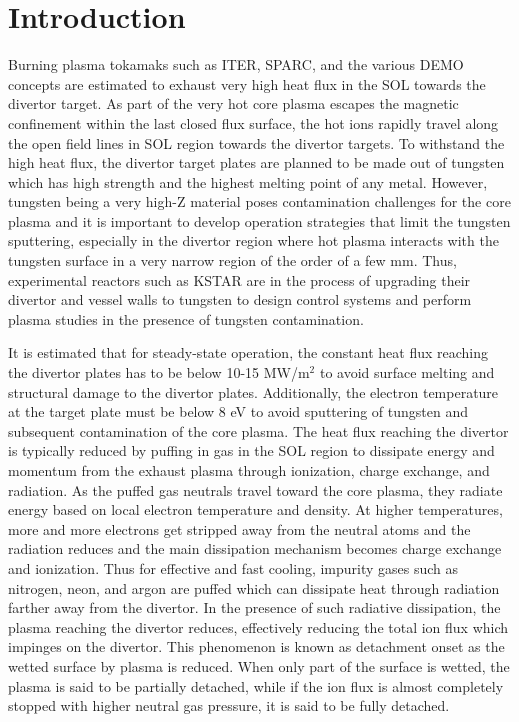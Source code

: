 \section{Introduction}
\label{sec:introduction}

Burning plasma tokamaks such as ITER\cite{Holtkamp_2007_FED}, SPARC\cite{Creely_2020_JPP}, and the various DEMO concepts are estimated to exhaust very high heat flux in the \ac{SOL} towards the divertor target.
As part of the very hot core plasma escapes the magnetic confinement within the last closed flux surface, the hot ions rapidly travel along the open field lines in \ac{SOL} region towards the divertor targets.
To withstand the high heat flux, the divertor target plates are planned to be made out of tungsten which has high strength and the highest melting point of any metal.
However, tungsten being a very high-Z material poses contamination challenges for the core plasma and it is important to develop operation strategies that limit the tungsten sputtering, especially in the divertor region where hot plasma interacts with the tungsten surface in a very narrow region of the order of a few mm\cite{Eich_2013_NF}.
Thus, experimental reactors such as KSTAR are in the process of upgrading their divertor and vessel walls to tungsten to design control systems and perform plasma studies in the presence of tungsten contamination.

It is estimated that for steady-state operation, the constant heat flux reaching the divertor plates has to be below 10-15 MW/m$^2$\cite{Pitts_2019_NME} to avoid surface melting and structural damage to the divertor plates.
Additionally, the electron temperature at the target plate must be below 8 eV\cite{Brezinsek_2019_NF} to avoid sputtering of tungsten and subsequent contamination of the core plasma.
The heat flux reaching the divertor is typically reduced by puffing in gas in the \ac{SOL} region to dissipate energy and momentum from the exhaust plasma through ionization, charge exchange, and radiation.
As the puffed gas neutrals travel toward the core plasma, they radiate energy based on local electron temperature and density.
At higher temperatures, more and more electrons get stripped away from the neutral atoms and the radiation reduces and the main dissipation mechanism becomes charge exchange and ionization.
Thus for effective and fast cooling, impurity gases such as nitrogen, neon, and argon are puffed which can dissipate heat through radiation farther away from the divertor.
In the presence of such radiative dissipation, the plasma reaching the divertor reduces, effectively reducing the total ion flux which impinges on the divertor.
This phenomenon is known as detachment onset as the wetted surface by plasma is reduced.
When only part of the surface is wetted, the plasma is said to be partially detached, while if the ion flux is almost completely stopped with higher neutral gas pressure, it is said to be fully detached.

